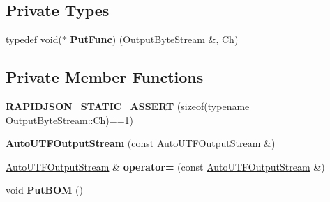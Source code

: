 \subsection*{Private Types}
\begin{DoxyCompactItemize}
\item 
typedef void($\ast$ {\bfseries Put\+Func}) (Output\+Byte\+Stream \&, Ch)\hypertarget{class_auto_u_t_f_output_stream_a398450792738ee1cb865fc96dfde9e1a}{}\label{class_auto_u_t_f_output_stream_a398450792738ee1cb865fc96dfde9e1a}

\end{DoxyCompactItemize}
\subsection*{Private Member Functions}
\begin{DoxyCompactItemize}
\item 
{\bfseries R\+A\+P\+I\+D\+J\+S\+O\+N\+\_\+\+S\+T\+A\+T\+I\+C\+\_\+\+A\+S\+S\+E\+RT} (sizeof(typename Output\+Byte\+Stream\+::\+Ch)==1)\hypertarget{class_auto_u_t_f_output_stream_a6fbc88c345f0b7beef9053e8a0315fb4}{}\label{class_auto_u_t_f_output_stream_a6fbc88c345f0b7beef9053e8a0315fb4}

\item 
{\bfseries Auto\+U\+T\+F\+Output\+Stream} (const \hyperlink{class_auto_u_t_f_output_stream}{Auto\+U\+T\+F\+Output\+Stream} \&)\hypertarget{class_auto_u_t_f_output_stream_aceb5330e6fddef6a439a105fe501f1d4}{}\label{class_auto_u_t_f_output_stream_aceb5330e6fddef6a439a105fe501f1d4}

\item 
\hyperlink{class_auto_u_t_f_output_stream}{Auto\+U\+T\+F\+Output\+Stream} \& {\bfseries operator=} (const \hyperlink{class_auto_u_t_f_output_stream}{Auto\+U\+T\+F\+Output\+Stream} \&)\hypertarget{class_auto_u_t_f_output_stream_a498613c6dcada9980fea3d6094f21215}{}\label{class_auto_u_t_f_output_stream_a498613c6dcada9980fea3d6094f21215}

\item 
void {\bfseries Put\+B\+OM} ()\hypertarget{class_auto_u_t_f_output_stream_abcfbaa81ceaddf06ae435ba3e78421d7}{}\label{class_auto_u_t_f_output_stream_abcfbaa81ceaddf06ae435ba3e78421d7}

\end{DoxyCompactItemize}
